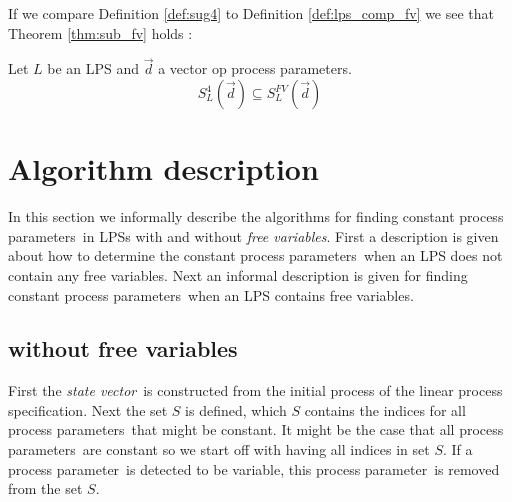 \index{}\documentclass[a4paper,10pt]{article}
\theoremstyle{plain}
\theoremstyle{definition}
\newcommand{\lps}{linear process specification}
\newcommand{\ovr}{\overrightarrow}
\newcommand{\pp}{process parameter}
\newcommand{\pps}{process parameters}
\newcommand{\ti}{\textit}
\newcommand{\tb}{\textbf}
\newcommand{\sv}{\textit{state vector}}
\begin{document}
If we compare Definition \ref{def:sug4} to Definition \ref{def:lps_comp_fv} we see that Theorem \ref{thm:sub_fv} holds :
\begin{thm}\label{thm:sub_fv} Let $L$ be an LPS and $\ovr{d}$ a vector op \pps .
$$S_L^4(\ovr{d}) \subseteq S_L^{FV}(\ovr{d}) $$
\end{thm}




\section{Algorithm description}
In this section we informally describe the algorithms for finding constant \pps\ in LPSs with and without \ti{free variables}. First a description is given about how to determine the constant \pps\ when an LPS does not contain any free variables. Next an informal description is given for finding constant \pps\ when an LPS contains free variables.

\subsection{without free variables}\label{alg:org}

First the \sv\ is constructed from the initial process of the \lps. Next the set $S$ is defined, which $S$ contains the indices for all \pps\ that might be constant. It might be the case that all \pps\ are constant so we start off with having all indices in set $S$. If a \pp\ is detected to be variable, this \pp\ is removed from the set $S$.
\end{document}
